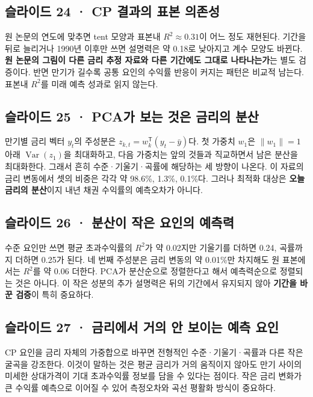 \documentclass[11pt,a4paper]{article}
\begin{document}
\subsection{슬라이드 24 · CP 결과의 표본 의존성}
원 논문의 연도에 맞추면 tent 모양과 표본내 $R^2\approx0.31$이 어느 정도 재현된다. 기간을 뒤로 늘리거나 1990년 이후만 쓰면 설명력은 약 0.18로 낮아지고 계수 모양도 바뀐다. \textbf{원 논문의 그림이 다른 금리 추정 자료와 다른 기간에도 그대로 나타나는가}는 별도 검증이다. 반면 만기가 길수록 공통 요인의 수익률 반응이 커지는 패턴은 비교적 남는다. 표본내 $R^2$를 미래 예측 성과로 읽지 않는다.\par

\subsection{슬라이드 25 · PCA가 보는 것은 금리의 분산}
만기별 금리 벡터 $y_t$의 주성분은 $z_{k,t}=w_k^{\mathsf T}(y_t-\bar y)$다. 첫 가중치 $w_1$은 $\|w_1\|=1$ 아래 $\operatorname{Var}(z_1)$을 최대화하고, 다음 가중치는 앞의 것들과 직교하면서 남은 분산을 최대화한다. 그래서 흔히 수준·기울기·곡률에 해당하는 세 방향이 나온다. 이 자료의 금리 변동에서 셋의 비중은 각각 약 98.6\%, 1.3\%, 0.1\%다. 그러나 최적화 대상은 \textbf{오늘 금리의 분산}이지 내년 채권 수익률의 예측오차가 아니다.\par

\subsection{슬라이드 26 · 분산이 작은 요인의 예측력}
수준 요인만 쓰면 평균 초과수익률의 $R^2$가 약 0.02지만 기울기를 더하면 0.24, 곡률까지 더하면 0.25가 된다. 네 번째 주성분은 금리 변동의 약 0.01\%만 차지해도 원 표본에서는 $R^2$를 약 0.06 더한다. PCA가 분산순으로 정렬한다고 해서 예측력순으로 정렬되는 것은 아니다. 이 작은 성분의 추가 설명력은 뒤의 기간에서 유지되지 않아 \textbf{기간을 바꾼 검증}이 특히 중요하다.\par

\subsection{슬라이드 27 · 금리에서 거의 안 보이는 예측 요인}
CP 요인을 금리 자체의 가중합으로 바꾸면 전형적인 수준·기울기·곡률과 다른 작은 굴곡을 강조한다. 이것이 말하는 것은 평균 금리가 거의 움직이지 않아도 만기 사이의 미세한 상대가격이 기대 초과수익률 정보를 담을 수 있다는 점이다. 작은 금리 변화가 큰 수익률 예측으로 이어질 수 있어 측정오차와 곡선 평활화 방식이 중요하다.\par
\end{document}
